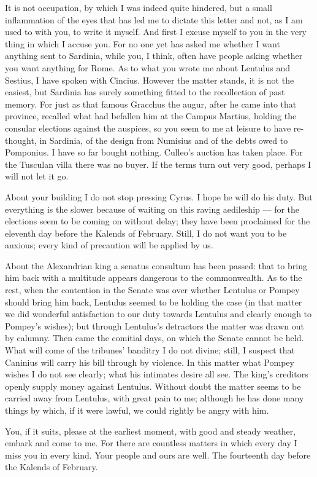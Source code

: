 

 It is not occupation, by which I was indeed quite hindered, but a small inflammation of the eyes that has led me to dictate this letter and not, as I am used to with you, to write it myself. And first I excuse myself to you in the very thing in which I accuse you. For no one yet has asked me whether I want anything sent to Sardinia, while you, I think, often have people asking whether you want anything for Rome. As to what you wrote me about Lentulus and Sestius, I have spoken with Cincius. However the matter stands, it is not the easiest, but Sardinia has surely something fitted to the recollection of past memory. For just as that famous Gracchus the augur, after he came into that province, recalled what had befallen him at the Campus Martius, holding the consular elections against the auspices, so you seem to me at leisure to have re-thought, in Sardinia, of the design from Numisius and of the debts owed to Pomponius. I have so far bought nothing. Culleo's auction has taken place. For the Tusculan villa there was no buyer. If the terms turn out very good, perhaps I will not let it go.

 About your building I do not stop pressing Cyrus. I hope he will do his duty. But everything is the slower because of waiting on this raving aedileship --- for the elections seem to be coming on without delay; they have been proclaimed for the eleventh day before the Kalends of February. Still, I do not want you to be anxious; every kind of precaution will be applied by us.

 About the Alexandrian king a senatus consultum has been passed: that to bring him back with a multitude appears dangerous to the commonwealth. As to the rest, when the contention in the Senate was over whether Lentulus or Pompey should bring him back, Lentulus seemed to be holding the case (in that matter we did wonderful satisfaction to our duty towards Lentulus and clearly enough to Pompey's wishes); but through Lentulus's detractors the matter was drawn out by calumny. Then came the comitial days, on which the Senate cannot be held. What will come of the tribunes' banditry I do not divine; still, I suspect that Caninius will carry his bill through by violence. In this matter what Pompey wishes I do not see clearly; what his intimates desire all see. The king's creditors openly supply money against Lentulus. Without doubt the matter seems to be carried away from Lentulus, with great pain to me; although he has done many things by which, if it were lawful, we could rightly be angry with him.

 You, if it suits, please at the earliest moment, with good and steady weather, embark and come to me. For there are countless matters in which every day I miss you in every kind. Your people and ours are well. The fourteenth day before the Kalends of February.
